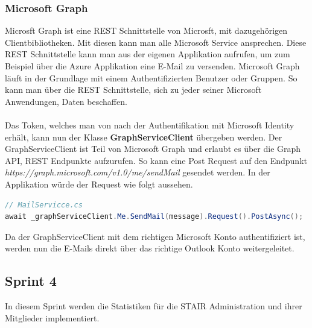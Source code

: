 \documentclass[a4paper, table]{article}
\begin{document}
\subsubsection*{Microsoft Graph}
Microsft Graph ist eine REST Schnittstelle von Microsft, mit dazugehörigen Clientbibliotheken.
Mit diesen kann man alle Microsoft Service ansprechen. \autocite{}
Diese REST Schnittstelle kann man aus der eigenen Applikation aufrufen, um zum Beispiel über die Azure Applikation eine E-Mail zu versenden.
Microsoft Graph läuft in der Grundlage mit einem Authentifizierten Benutzer oder Gruppen.
So kann man über die REST Schnittstelle, sich zu jeder seiner Microsoft Anwendungen, Daten beschaffen.\\\\
Das Token, welches man von nach der Authentifikation mit Microsoft Identity erhält, kann nun der Klasse \textbf{GraphServiceClient} übergeben werden.
Der GraphServiceClient ist Teil von Microsoft Graph und erlaubt es über die Graph API, REST Endpunkte aufzurufen.
So kann eine Post Request auf den Endpunkt \textit{https://graph.microsoft.com/v1.0/me/sendMail} gesendet werden.
In der Applikation würde der Request wie folgt aussehen.

\begin{lstlisting}[language=csharp]
// MailServicce.cs
await _graphServiceClient.Me.SendMail(message).Request().PostAsync();
\end{lstlisting}

Da der GraphServiceClient mit dem richtigen Microsoft Konto authentifiziert ist, 
werden nun die E-Mails direkt über das richtige Outlook Konto weitergeleitet.


\newpage
\subsection{Sprint 4}
In diesem Sprint werden die Statistiken für die STAIR Administration und ihrer Mitglieder implementiert.
\end{document}
